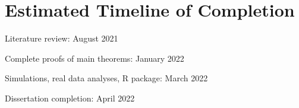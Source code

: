 \documentclass[
  11pt,
]{article}
\begin{document}
\hypertarget{estimated-timeline-of-completion}{%
\section{Estimated Timeline of
Completion}\label{estimated-timeline-of-completion}}

Literature review: August 2021

Complete proofs of main theorems: January 2022

Simulations, real data analyses, R package: March 2022

Dissertation completion: April 2022

\renewcommand\refname{References}
  
\end{document}

